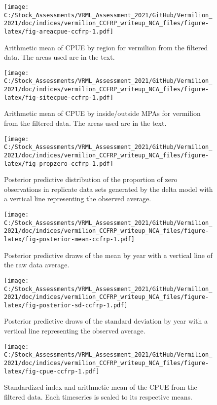 \documentclass[
]{article}
\begin{document}
\begin{figure}
\centering
\texttt{[image: C:/Stock\_Assessments/VRML\_Assessment\_2021/GitHub/Vermilion\_2021/doc/indices/vermilion\_CCFRP\_writeup\_NCA\_files/figure-latex/fig-areacpue-ccfrp-1.pdf]}
\caption{\label{fig:fig-areacpue-ccfrp}Arithmetic mean of CPUE by region for vermilion from the filtered data. The areas used are in the text.}
\end{figure}

\begin{figure}
\centering
\texttt{[image: C:/Stock\_Assessments/VRML\_Assessment\_2021/GitHub/Vermilion\_2021/doc/indices/vermilion\_CCFRP\_writeup\_NCA\_files/figure-latex/fig-sitecpue-ccfrp-1.pdf]}
\caption{\label{fig:fig-sitecpue-ccfrp}Arithmetic mean of CPUE by inside/outside MPAs for vermilion from the filtered data. The areas used are in the text.}
\end{figure}

\begin{figure}
\centering
\texttt{[image: C:/Stock\_Assessments/VRML\_Assessment\_2021/GitHub/Vermilion\_2021/doc/indices/vermilion\_CCFRP\_writeup\_NCA\_files/figure-latex/fig-propzero-ccfrp-1.pdf]}
\caption{\label{fig:fig-propzero-ccfrp}Posterior predictive distribution of the proportion of zero observations in replicate data sets generated by the delta model with a vertical line representing the observed average.}
\end{figure}

\begin{figure}
\centering
\texttt{[image: C:/Stock\_Assessments/VRML\_Assessment\_2021/GitHub/Vermilion\_2021/doc/indices/vermilion\_CCFRP\_writeup\_NCA\_files/figure-latex/fig-posterior-mean-ccfrp-1.pdf]}
\caption{\label{fig:fig-posterior-mean-ccfrp}Posterior predictive draws of the mean by year with a vertical line of the raw data average.}
\end{figure}

\begin{figure}
\centering
\texttt{[image: C:/Stock\_Assessments/VRML\_Assessment\_2021/GitHub/Vermilion\_2021/doc/indices/vermilion\_CCFRP\_writeup\_NCA\_files/figure-latex/fig-posterior-sd-ccfrp-1.pdf]}
\caption{\label{fig:fig-posterior-sd-ccfrp}Posterior predictive draws of the standard deviation by year with a vertical line representing the observed average.}
\end{figure}

\begin{figure}
\centering
\texttt{[image: C:/Stock\_Assessments/VRML\_Assessment\_2021/GitHub/Vermilion\_2021/doc/indices/vermilion\_CCFRP\_writeup\_NCA\_files/figure-latex/fig-cpue-ccfrp-1.pdf]}
\caption{\label{fig:fig-cpue-ccfrp}Standardized index and arithmetic mean of the CPUE from the filtered data. Each timeseries is scaled to its respective means.}
\end{figure}
\end{document}
